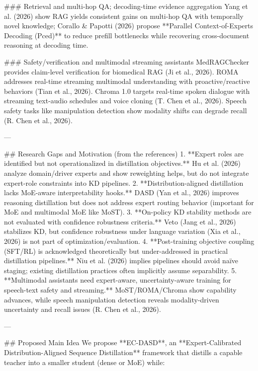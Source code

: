 ### Retrieval and multi-hop QA; decoding-time evidence aggregation  
Yang et al. (2026) show RAG yields consistent gains on multi-hop QA with temporally novel knowledge; Corallo & Papotti (2026) propose **Parallel Context-of-Experts Decoding (Pced)** to reduce prefill bottlenecks while recovering cross-document reasoning at decoding time.

### Safety/verification and multimodal streaming assistants  
MedRAGChecker provides claim-level verification for biomedical RAG (Ji et al., 2026). ROMA addresses real-time streaming multimodal understanding with proactive/reactive behaviors (Tian et al., 2026). Chroma 1.0 targets real-time spoken dialogue with streaming text-audio schedules and voice cloning (T. Chen et al., 2026). Speech safety tasks like manipulation detection show modality shifts can degrade recall (R. Chen et al., 2026).

---

## Research Gaps and Motivation (from the references)  
1. **Expert roles are identified but not operationalized in distillation objectives.** Hu et al. (2026) analyze domain/driver experts and show reweighting helps, but do not integrate expert-role constraints into KD pipelines.  
2. **Distribution-aligned distillation lacks MoE-aware interpretability hooks.** DASD (Yan et al., 2026) improves reasoning distillation but does not address expert routing behavior (important for MoE and multimodal MoE like MoST).  
3. **On-policy KD stability methods are not evaluated with confidence robustness criteria.** Veto (Jang et al., 2026) stabilizes KD, but confidence robustness under language variation (Xia et al., 2026) is not part of optimization/evaluation.  
4. **Post-training objective coupling (SFT/RL) is acknowledged theoretically but under-addressed in practical distillation pipelines.** Niu et al. (2026) implies pipelines should avoid naïve staging; existing distillation practices often implicitly assume separability.  
5. **Multimodal assistants need expert-aware, uncertainty-aware training for speech-text safety and streaming.** MoST/ROMA/Chroma show capability advances, while speech manipulation detection reveals modality-driven uncertainty and recall issues (R. Chen et al., 2026).

---

## Proposed Main Idea  
We propose **EC-DASD**, an **Expert-Calibrated Distribution-Aligned Sequence Distillation** framework that distills a capable teacher into a smaller student (dense or MoE) while:

